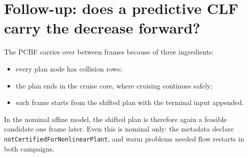 \documentclass[11pt]{article}
\begin{document}
\section{Follow-up: does a predictive CLF carry the decrease forward?}
The PCBF carries over between frames because of three ingredients:
\begin{itemize}
\item every plan node has collision rows;
\item the plan ends in the cruise core, where cruising continues safely;
\item each frame starts from the shifted plan with the terminal input appended.
\end{itemize}
In the nominal affine model, the shifted plan is therefore again a feasible
candidate one frame later. Even this is nominal only: the metadata declare
\texttt{notCertifiedForNonlinearPlant}, and warm problems needed flow restarts
in both campaigns.
\end{document}
